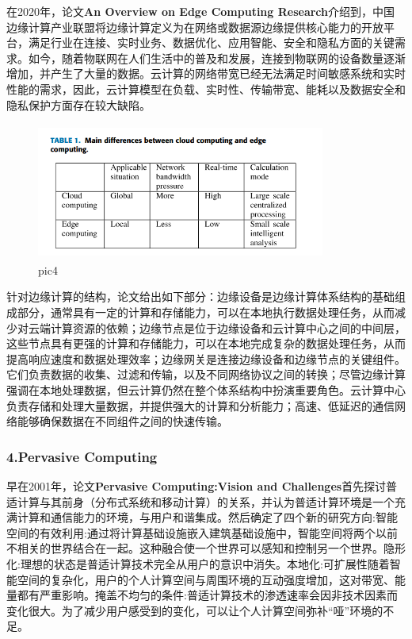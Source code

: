 \documentclass[a4paper,twoside]{scrbook}
\begin{document}
在2020年，论文\textbf{An Overview on Edge Computing Research}介绍到，中国边缘计算产业联盟将边缘计算定义为在网络或数据源边缘提供核心能力的开放平台，满足行业在连接、实时业务、数据优化、应用智能、安全和隐私方面的关键需求。如今，随着物联网在人们生活中的普及和发展，连接到物联网的设备数量逐渐增加，并产生了大量的数据。云计算的网络带宽已经无法满足时间敏感系统和实时性能的需求，因此，云计算模型在负载、实时性、传输带宽、能耗以及数据安全和隐私保护方面存在较大缺陷。
\begin{figure}
\centering %
\includegraphics[height=4.5cm,width=9.5cm]{edge1.png}
\caption{pic4}
\end{figure}
针对边缘计算的结构，论文给出如下部分：边缘设备是边缘计算体系结构的基础组成部分，通常具有一定的计算和存储能力，可以在本地执行数据处理任务，从而减少对云端计算资源的依赖；边缘节点是位于边缘设备和云计算中心之间的中间层，这些节点具有更强的计算和存储能力，可以在本地完成复杂的数据处理任务，从而提高响应速度和数据处理效率；边缘网关是连接边缘设备和边缘节点的关键组件。它们负责数据的收集、过滤和传输，以及不同网络协议之间的转换；尽管边缘计算强调在本地处理数据，但云计算仍然在整个体系结构中扮演重要角色。云计算中心负责存储和处理大量数据，并提供强大的计算和分析能力；高速、低延迟的通信网络能够确保数据在不同组件之间的快速传输。


\subsubsection{4.Pervasive Computing}

早在2001年，论文\textbf{Pervasive Computing:Vision and Challenges}首先探讨普适计算与其前身（分布式系统和移动计算）的关系，并认为普适计算环境是一个充满计算和通信能力的环境，与用户和谐集成。然后确定了四个新的研究方向:智能空间的有效利用:通过将计算基础设施嵌入建筑基础设施中，智能空间将两个以前不相关的世界结合在一起。这种融合使一个世界可以感知和控制另一个世界。隐形化:理想的状态是普适计算技术完全从用户的意识中消失。本地化:可扩展性随着智能空间的复杂化，用户的个人计算空间与周围环境的互动强度增加，这对带宽、能量都有严重影响。掩盖不均匀的条件:普适计算技术的渗透速率会因非技术因素而变化很大。为了减少用户感受到的变化，可以让个人计算空间弥补“哑”环境的不足。
\end{document}
